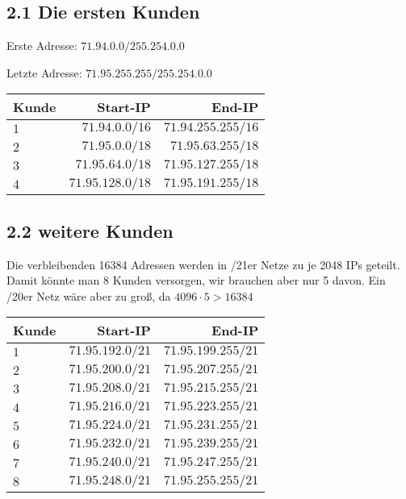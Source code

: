 \begin{multicols}{2}

\subsection{2.1 Die ersten Kunden}

Erste Adresse: $71.94.0.0/255.254.0.0$

Letzte Adresse: $71.95.255.255/255.254.0.0$

\begin{tabular}{|l|r|r|}\hline
Kunde & Start-IP & End-IP \\\hline\hline
$1$ & $71.94.0.0/16$ & $71.94.255.255/16$ \\\hline
$2$ & $71.95.0.0/18$ & $71.95.63.255/18$ \\\hline
$3$ & $71.95.64.0/18$ & $71.95.127.255/18$ \\\hline
$4$ & $71.95.128.0/18$ & $71.95.191.255/18$ \\\hline
\end{tabular}

\vspace{4cm}

\subsection{2.2 weitere Kunden}
Die verbleibenden 16384 Adressen werden in /21er Netze zu je 2048 IPs geteilt. Damit könnte man 8 Kunden versorgen, wir brauchen aber nur 5 davon. Ein /20er Netz wäre aber zu groß, da $4096 \cdot 5 > 16384$\\[5mm]
\begin{tabular}{|l|r|r|}\hline
Kunde & Start-IP & End-IP \\\hline\hline
$1$ & $71.95.192.0/21$ & $71.95.199.255/21$ \\\hline
$2$ & $71.95.200.0/21$ & $71.95.207.255/21$ \\\hline
$3$ & $71.95.208.0/21$ & $71.95.215.255/21$ \\\hline
$4$ & $71.95.216.0/21$ & $71.95.223.255/21$ \\\hline
$5$ & $71.95.224.0/21$ & $71.95.231.255/21$ \\\hline\hline
$6$ & $71.95.232.0/21$ & $71.95.239.255/21$ \\\hline
$7$ & $71.95.240.0/21$ & $71.95.247.255/21$ \\\hline
$8$ & $71.95.248.0/21$ & $71.95.255.255/21$ \\\hline
\end{tabular}



\end{multicols}
